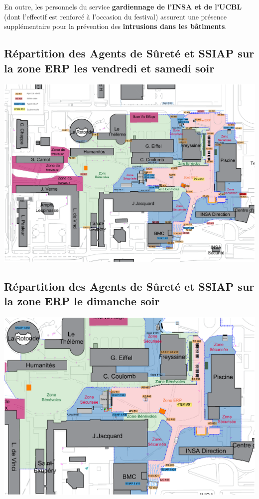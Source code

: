 \documentclass[hidelinks, paper=a4, fontsize=13pt]{report}
\begin{document}
En outre, les personnels du service \textbf{gardiennage de l’INSA et de l’UCBL} (dont l'effectif est renforcé à l'occasion du festival) assurent une présence supplémentaire pour la prévention des \textbf{intrusions dans les bâtiments}.


\subsection{Répartition des Agents de Sûreté et SSIAP sur la zone ERP les vendredi et samedi soir}
\label{refRepartitionAgentsDeSurete}
\begin{center}
	\includegraphics[width=\textwidth,keepaspectratio, angle=90]{Exports/Plan_24h_44eme-AS_Nuit}
\end{center}

\subsection{Répartition des Agents de Sûreté et SSIAP sur la zone ERP le dimanche soir}
\label{refRepartitionAgentsDeSureteDimanche}
\begin{center}
	\includegraphics[width=\textwidth,keepaspectratio, angle=90]{Exports/Plan_24h_44eme-AS_Dimanche}
\end{center}
\end{document}
